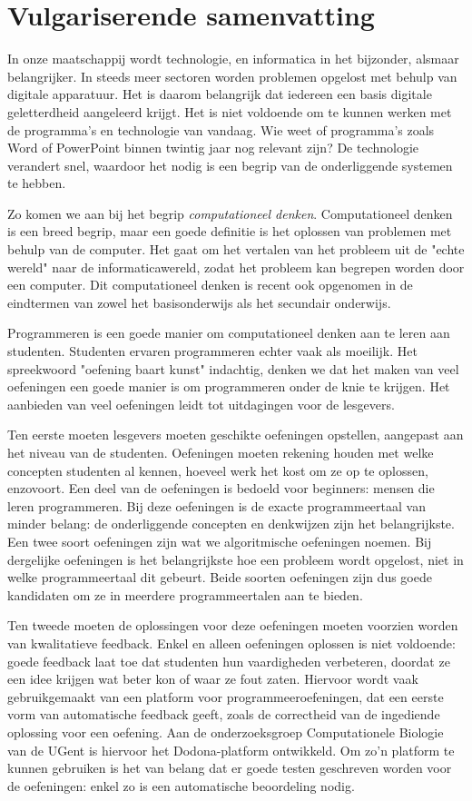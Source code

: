 \chapter*{Vulgariserende samenvatting}

In onze maatschappij wordt technologie, en informatica in het bijzonder, alsmaar belangrijker.
In steeds meer sectoren worden problemen opgelost met behulp van digitale apparatuur.
Het is daarom belangrijk dat iedereen een basis digitale geletterdheid aangeleerd krijgt.
Het is niet voldoende om te kunnen werken met de programma's en technologie van vandaag.
Wie weet of programma's zoals Word of PowerPoint binnen twintig jaar nog relevant zijn?
De technologie verandert snel, waardoor het nodig is een begrip van de onderliggende systemen te hebben.

Zo komen we aan bij het begrip \emph{computationeel denken}.
Computationeel denken is een breed begrip, maar een goede definitie is het oplossen van problemen met behulp van de computer.
Het gaat om het vertalen van het probleem uit de "echte wereld" naar de informaticawereld, zodat het probleem kan begrepen worden door een computer.
Dit computationeel denken is recent ook opgenomen in de eindtermen van zowel het basisonderwijs als het secundair onderwijs.

Programmeren is een goede manier om computationeel denken aan te leren aan studenten.
Studenten ervaren programmeren echter vaak als moeilijk.
Het spreekwoord "oefening baart kunst" indachtig, denken we dat het maken van veel oefeningen een goede manier is om programmeren onder de knie te krijgen.
Het aanbieden van veel oefeningen leidt tot uitdagingen voor de lesgevers.

Ten eerste moeten lesgevers moeten geschikte oefeningen opstellen, aangepast aan het niveau van de studenten.
Oefeningen moeten rekening houden met welke concepten studenten al kennen, hoeveel werk het kost om ze op te oplossen, enzovoort.
Een deel van de oefeningen is bedoeld voor beginners: mensen die leren programmeren.
Bij deze oefeningen is de exacte programmeertaal van minder belang: de onderliggende concepten en denkwijzen zijn het belangrijkste.
Een twee soort oefeningen zijn wat we algoritmische oefeningen noemen.
Bij dergelijke oefeningen is het belangrijkste hoe een probleem wordt opgelost, niet in welke programmeertaal dit gebeurt.
Beide soorten oefeningen zijn dus goede kandidaten om ze in meerdere programmeertalen aan te bieden.

Ten tweede moeten de oplossingen voor deze oefeningen moeten voorzien worden van kwalitatieve feedback.
Enkel en alleen oefeningen oplossen is niet voldoende: goede feedback laat toe dat studenten hun vaardigheden verbeteren, doordat ze een idee krijgen wat beter kon of waar ze fout zaten.
Hiervoor wordt vaak gebruikgemaakt van een platform voor programmeeroefeningen, dat een eerste vorm van automatische feedback geeft, zoals de correctheid van de ingediende oplossing voor een oefening.
Aan de onderzoeksgroep Computationele Biologie van de UGent is hiervoor het Dodona-platform ontwikkeld.
Om zo'n platform te kunnen gebruiken is het van belang dat er goede testen geschreven worden voor de oefeningen: enkel zo is een automatische beoordeling nodig.

